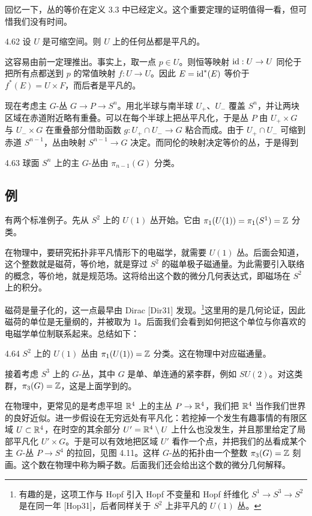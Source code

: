 回忆一下，丛的等价在定义 3.3 中已经定义。这个重要定理的证明值得一看，但可惜我们没有时间。

\begin{proposition}{4.62}
设 $U$ 是可缩空间。则 $U$ 上的任何丛都是平凡的。
\end{proposition}

这容易由前一定理推出。事实上，取一点 $p\in U$。则恒等映射 $\mathrm{id}:U\to U$ 同伦于把所有点都送到 $p$ 的常值映射 $f:U\to U$。因此 $E=\mathrm{id}^*(E)$ 等价于 $f^*(E)=U\times F$，而后者是平凡的。

现在考虑主 $G$-丛 $G\to P\to S^n$。用北半球与南半球 $U_+$、$U_-$ 覆盖 $S^n$，并让两块区域在赤道附近略有重叠。可以在每个半球上把丛平凡化，于是丛 $P$ 由 $U_+\times G$ 与 $U_-\times G$ 在重叠部分借助函数 $g:U_+\cap U_-\to G$ 粘合而成。由于 $U_+\cap U_-$ 可缩到赤道 $S^{n-1}$，丛由映射 $S^{n-1}\to G$ 决定。而同伦的映射决定等价的丛，于是得到

\begin{proposition}{4.63}
球面 $S^n$ 上的主 $G$-丛由 $\pi_{n-1}(G)$ 分类。
\end{proposition}

\subsection{例}

有两个标准例子。先从 $S^2$ 上的 $U(1)$ 丛开始。它由 $\pi_1(U(1))=\pi_1(S^1)=\mathbb{Z}$ 分类。

在物理中，要研究拓扑非平凡情形下的电磁学，就需要 $U(1)$ 丛。后面会知道，这个整数就是磁荷，等价地，就是穿过 $S^2$ 的磁单极子磁通量。为此需要引入联络的概念，等价地，就是规范场。这将给出这个数的微分几何表达式，即磁场在 $S^2$ 上的积分。

磁荷是量子化的，这一点最早由 Dirac [Dir31] 发现。\footnote[12]{有趣的是，这项工作与 Hopf 引入 Hopf 不变量和 Hopf 纤维化 $S^1\to S^3\to S^2$ 是在同一年 [Hop31]，后者同样关于 $S^2$ 上非平凡的 $U(1)$ 丛。}这里用的是几何论证，因此磁荷的单位是无量纲的，并被取为 $1$。后面我们会看到如何把这个单位与你喜欢的电磁学单位制联系起来。总结如下：

\begin{example}{4.64}
$S^2$ 上的 $U(1)$ 丛由 $\pi_1(U(1))=\mathbb{Z}$ 分类。这在物理中对应磁通量。
\end{example}

接着考虑 $S^3$ 上的 $G$-丛，其中 $G$ 是单、单连通的紧李群，例如 $SU(2)$。对这类群，$\pi_3(G)=\mathbb{Z}$，这是上面学到的。

在物理中，更常见的是考虑平坦 $\mathbb{R}^4$ 上的主丛 $P\to\mathbb{R}^4$，我们把 $\mathbb{R}^4$ 当作我们世界的良好近似。进一步假设在无穷远处有平凡化：若挖掉一个发生有趣事情的有限区域 $U\subset\mathbb{R}^4$，在时空的其余部分 $U'=\mathbb{R}^4\setminus U$ 上什么也没发生，并且那里给定了局部平凡化 $U'\times G$。于是可以有效地把区域 $U'$ 看作一个点，并把我们的丛看成某个主 $G$-丛 $P\to S^4$ 的拉回，见图 4.11。这样 $G$-丛的拓扑由一个整数 $\pi_3(G)=\mathbb{Z}$ 刻画。这个数在物理中称为瞬子数。后面我们还会给出这个数的微分几何解释。

